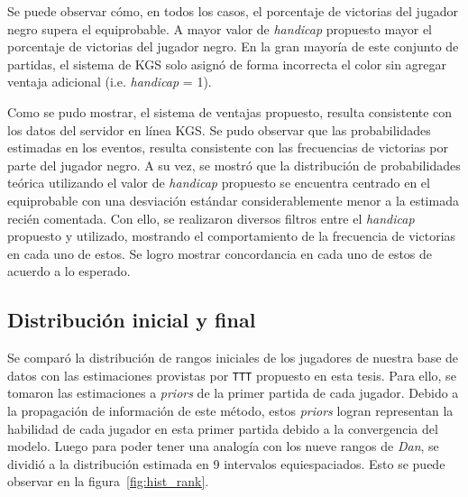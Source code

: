 \documentclass[11pt,twoside,spanish]{report} %
\begin{document}
Se puede observar c\'omo, en todos los casos, el porcentaje de victorias del jugador negro supera el equiprobable. 
A mayor valor de \textit{handicap} propuesto mayor el porcentaje de victorias del jugador negro.
En la gran mayor\'ia de este conjunto de partidas, el sistema de KGS solo asign\'o de forma incorrecta el color sin agregar ventaja adicional (i.e. \textit{handicap} = 1).

Como se pudo mostrar, el sistema de ventajas propuesto, resulta consistente con los datos del servidor en l\'inea KGS.
Se pudo observar que las probabilidades estimadas en los eventos, resulta consistente con las frecuencias de victorias por parte del jugador negro.
A su vez, se mostr\'o que la distribuci\'on de probabilidades te\'orica utilizando el valor de \textit{handicap} propuesto se encuentra centrado en el equiprobable con una desviaci\'on est\'andar considerablemente menor a la estimada reci\'en comentada.
Con ello, se realizaron diversos filtros entre el \textit{handicap} propuesto y utilizado, mostrando el comportamiento de la frecuencia de victorias en cada uno de estos.
Se logro mostrar concordancia en cada uno de estos de acuerdo a lo esperado.







\vspace{7cm}
\subsection{Distribuci\'on inicial y final}

Se compar\'o la distribuci\'on de rangos iniciales de los jugadores de nuestra base de datos con las estimaciones provistas por \texttt{TTT} propuesto en esta tesis.
Para ello, se tomaron las estimaciones a \textit{priors} de la primer partida de cada jugador.
Debido a la propagaci\'on de informaci\'on de este m\'etodo, estos \textit{priors} logran representan la habilidad de cada jugador en esta primer partida debido a la convergencia del modelo.
Luego para poder tener una analog\'ia con los nueve rangos de \textit{Dan}, se dividi\'o a la distribuci\'on estimada en 9 intervalos equiespaciados.
Esto se puede observar en la figura~\ref{fig:hist_rank}.
\end{document}
